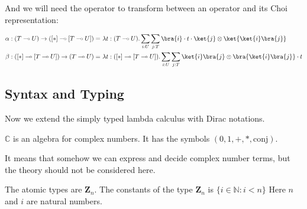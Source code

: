 And we will need the operator to transform between an operator and its Choi representation:

\begin{definition}
  \begin{align*}
    \alpha : (T \multimap U) \to ([*] \multimap [T \multimap U]) =\ & \lambda t : (T \multimap U). \sum_{i : U} \sum_{j : T} \bra{i} \cdot t \cdot \ket{j} \otimes \ket{\ket{i}\bra{j}}\\
    \beta : ([*] \multimap [T \multimap U]) \to (T \multimap U) =\ & \lambda t : ([*] \multimap [T \multimap U]). \sum_{i : U} \sum_{j : T} \ket{i}\bra{j} \otimes \bra{\ket{i}\bra{j}} \cdot t
  \end{align*}
  
\end{definition}


\subsection{Syntax and Typing}

Now we extend the simply typed lambda calculus with Dirac notations.

\begin{postulate}
  $\mathbb{C}$ is an algebra for complex numbers. It has the symbols $(0, 1, +, *, \textrm{conj})$.
\end{postulate}
It means that somehow we can express and decide complex number terms, but the theory should not be considered here.

\begin{definition}
  The atomic types are $\mathbf{Z}_n$.
  The constants of the type $\mathbf{Z}_n$ is $\{i \in \mathbb{N} : i<n\}$
  Here $n$ and $i$ are natural numbers.
\end{definition}


